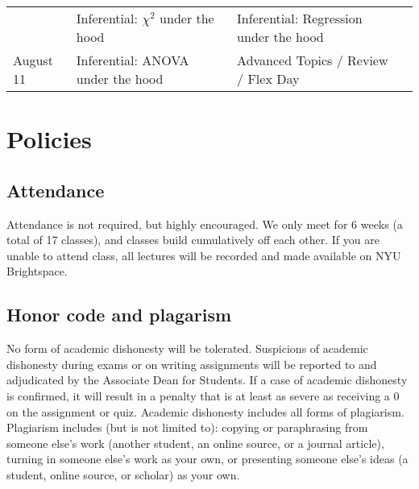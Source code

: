 \documentclass[
]{book}
\begin{document}
\begin{longtable}[]{@{}llll@{}}
\begin{minipage}[t]{0.09\columnwidth}
\end{minipage} & \begin{minipage}[t]{0.32\columnwidth}\raggedright
Inferential: \(\chi^2\) under the hood\strut
\end{minipage} & \begin{minipage}[t]{0.29\columnwidth}\raggedright
Inferential: Regression under the hood\strut
\end{minipage} & \begin{minipage}[t]{0.18\columnwidth}\raggedright
\strut
\end{minipage}\tabularnewline
\begin{minipage}[t]{0.09\columnwidth}\raggedright
August 11\strut
\end{minipage} & \begin{minipage}[t]{0.32\columnwidth}\raggedright
Inferential: ANOVA under the hood\strut
\end{minipage} & \begin{minipage}[t]{0.29\columnwidth}\raggedright
Advanced Topics / Review / Flex Day\strut
\end{minipage} & \begin{minipage}[t]{0.18\columnwidth}\raggedright
\strut
\end{minipage}\tabularnewline
\bottomrule
\end{longtable}

\hypertarget{policies}{%
\section{Policies}\label{policies}}

\hypertarget{attendance}{%
\subsection{Attendance}\label{attendance}}

Attendance is not required, but highly encouraged. We only meet for 6 weeks (a total of 17 classes), and classes build cumulatively off each other. If you are unable to attend class, all lectures will be recorded and made available on NYU Brightspace.

\hypertarget{honor-code-and-plagarism}{%
\subsection{Honor code and plagarism}\label{honor-code-and-plagarism}}

No form of academic dishonesty will be tolerated. Suspicions of academic dishonesty during exams or on writing assignments will be reported to and adjudicated by the Associate Dean for Students. If a case of academic dishonesty is confirmed, it will result in a penalty that is at least as severe as receiving a 0 on the assignment or quiz. Academic dishonesty includes all forms of plagiarism. Plagiarism includes (but is not limited to): copying or paraphrasing from someone else's work (another student, an online source, or a journal article), turning in someone else's work as your own, or presenting someone else's ideas (a student, online source, or scholar) as your own.
\end{document}
